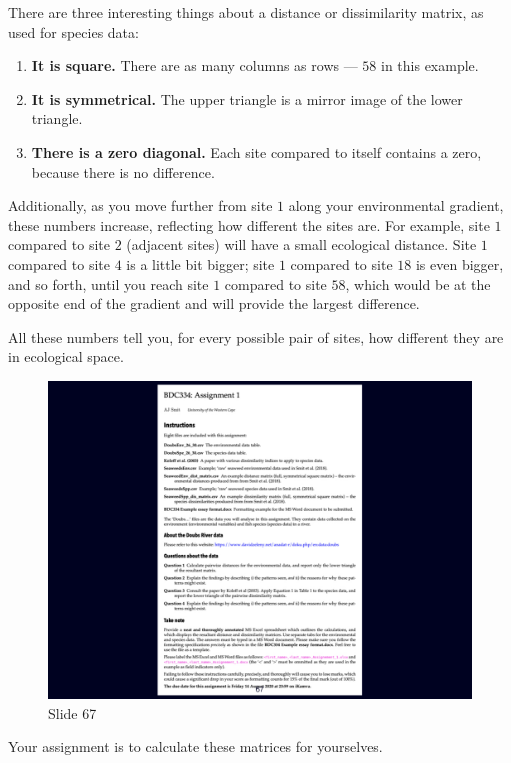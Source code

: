 \documentclass[
  12pt,
]{book}
\providecommand{\tightlist}{%
  \setlength{\itemsep}{0pt}\setlength{\parskip}{0pt}}
\begin{document}
There are three interesting things about a distance or dissimilarity
matrix, as used for species data:

\begin{enumerate}
\def\labelenumi{\arabic{enumi}.}
\tightlist
\item
  \textbf{It is square.} There are as many columns as rows --- \(58\) in
  this example.
\item
  \textbf{It is symmetrical.} The upper triangle is a mirror image of
  the lower triangle.
\item
  \textbf{There is a zero diagonal.} Each site compared to itself
  contains a zero, because there is no difference.
\end{enumerate}

Additionally, as you move further from site \(1\) along your
environmental gradient, these numbers increase, reflecting how different
the sites are. For example, site \(1\) compared to site \(2\) (adjacent
sites) will have a small ecological distance. Site \(1\) compared to
site \(4\) is a little bit bigger; site \(1\) compared to site \(18\) is
even bigger, and so forth, until you reach site \(1\) compared to site
\(58\), which would be at the opposite end of the gradient and will
provide the largest difference.

All these numbers tell you, for every possible pair of sites, how
different they are in ecological space.

\begin{figure}[ht]
\centering
\includegraphics[width=0.8\linewidth]{../images/BDC334/BDC334-067.jpeg}
\caption*{Slide 67}
\end{figure}

Your assignment is to calculate these matrices for yourselves.
\end{document}
